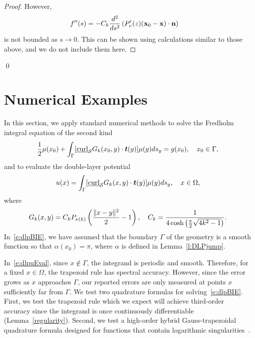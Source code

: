 \begin{proof}
However,
\begin{align*} 
  f''(s) &= -C_k \frac{d^2}{ds^2}\left( P'_\nu(z) 
  (\mathbf{x}_{0}-\mathbf{x}) \cdot \mathbf{n} \right)
\end{align*}
is not bounded as $s\rightarrow 0$. This can be shown using calculations
similar to those above, and we do not include them here.
\end{proof}
\qed


\section{Numerical Examples}
\label{s:numerics}
In this section, we apply standard numerical methods to solve the
Fredholm integral equation of the second kind
\begin{align}
  \label{e:dlpBIE}
  \frac{1}{2}\mu(x_{0}) + \int_{\Gamma}
    [\underline{\mbox{curl}}_{\S}G_{k}(x_{0},y) \cdot
    \vec{t}(y)] \mu(y)ds_{y} = g(x_{0}), \quad x_{0} \in \Gamma,
\end{align}
and to evaluate the double-layer potential
\begin{align}
  \label{e:dlpuEval}
  u(x) = \int_{\Gamma} [\underline{\mbox{curl}}_{\S}G_{k}(x,y) 
    \cdot \vec{t}(y)] \mu(y)ds_{y}, \quad x \in \Omega,
\end{align}
where
\begin{align*}
  G_{k}(x,y) = C_k P_{\nu(k)} \left(
    \frac{\|x - y\|^{2}}{2} - 1\right), \quad 
  C_k = \frac{1}{4\cosh\left(\frac{\pi}{2}\sqrt{4k^{2}-1}\right)}.
\end{align*}
In~\eqref{e:dlpBIE}, we have assumed that the boundary $\Gamma$ of the
geometry is a smooth function so that $\alpha(x_{0}) = \pi$, where
$\alpha$ is defined in Lemma~\ref{l:DLPjump}.

In~\eqref{e:dlpuEval}, since $x \notin \Gamma$, the integrand is
periodic and smooth.  Therefore, for a fixed $x\in \Omega$, the
trapezoid rule has spectral accuracy.  However, since the error grows as
$x$ approaches $\Gamma$, our reported errors are only measured at points
$x$ sufficiently far from $\Gamma$.  We test two quadrature formulas for
solving~\eqref{e:dlpBIE}.  First, we test the trapezoid rule which we
expect will achieve third-order accuracy since the integrand is once
continuously differentiable (Lemma~\ref{regularity}).  Second, we test a
high-order hybrid Gauss-trapezoidal quadrature formula designed for
functions that contain logarithmic singularities~\cite{alpert}.

